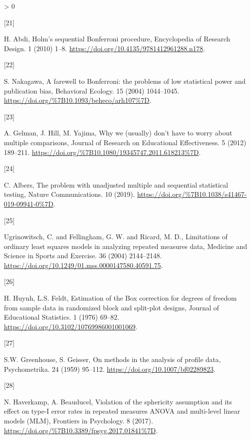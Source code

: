 \documentclass[
]{article}
\newlength{\cslhangindent}
\newlength{\csllabelwidth}
\newenvironment{CSLReferences}[2] %
 {%
  \setlength{\parindent}{0pt}
  \ifodd #1 \everypar{\setlength{\hangindent}{\cslhangindent}}\ignorespaces\fi
  \ifnum #2 > 0
  \setlength{\parskip}{#2\baselineskip}
  \fi
 }%
 {}
\newcommand{\CSLLeftMargin}[1]{\parbox[t]{\csllabelwidth}{#1}}
\newcommand{\CSLRightInline}[1]{\parbox[t]{\linewidth - \csllabelwidth}{#1}\break}
\begin{document}
\begin{CSLReferences}{0}{0}
\leavevmode\hypertarget{ref-abdi2010}{}%
\CSLLeftMargin{{[}21{]} }
\CSLRightInline{H. Abdi, {Holm's sequential Bonferroni procedure}, Encyclopedia of Research Design. 1 (2010) 1--8. \url{https://doi.org/10.4135/9781412961288.n178}.}

\leavevmode\hypertarget{ref-nakagawa2004}{}%
\CSLLeftMargin{{[}22{]} }
\CSLRightInline{S. Nakagawa, {A farewell to Bonferroni: the problems of low statistical power and publication bias}, {Behavioral Ecology}. {15} (2004) 1044--1045. \url{https://doi.org/\%7B10.1093/beheco/arh107\%7D}.}

\leavevmode\hypertarget{ref-gelman2012}{}%
\CSLLeftMargin{{[}23{]} }
\CSLRightInline{A. Gelman, J. Hill, M. Yajima, {Why we (usually) don't have to worry about multiple comparisons}, {Journal of Research on Educational Effectiveness}. {5} (2012) 189--211. \url{https://doi.org/\%7B10.1080/19345747.2011.618213\%7D}.}

\leavevmode\hypertarget{ref-albers2019}{}%
\CSLLeftMargin{{[}24{]} }
\CSLRightInline{C. Albers, {The problem with unadjusted multiple and sequential statistical testing}, {Nature Communications}. {10} (2019). \url{https://doi.org/\%7B10.1038/s41467-019-09941-0\%7D}.}

\leavevmode\hypertarget{ref-ugrinowitsch2004}{}%
\CSLLeftMargin{{[}25{]} }
\CSLRightInline{Ugrinowitsch, C. and Fellingham, G. W. and Ricard, M. D., Limitations of ordinary least squares models in analyzing repeated measures data, Medicine and Science in Sports and Exercise. 36 (2004) 2144--2148. \url{https://doi.org/10.1249/01.mss.0000147580.40591.75}.}

\leavevmode\hypertarget{ref-huynh1976}{}%
\CSLLeftMargin{{[}26{]} }
\CSLRightInline{H. Huynh, L.S. Feldt, {Estimation of the Box correction for degrees of freedom from sample data in randomized block and split-plot designs}, Journal of Educational Statistics. 1 (1976) 69--82. \url{https://doi.org/10.3102/10769986001001069}.}

\leavevmode\hypertarget{ref-greenhouse1959}{}%
\CSLLeftMargin{{[}27{]} }
\CSLRightInline{S.W. Greenhouse, S. Geisser, On methods in the analysis of profile data, Psychometrika. 24 (1959) 95--112. \url{https://doi.org/10.1007/bf02289823}.}

\leavevmode\hypertarget{ref-haverkamp2017}{}%
\CSLLeftMargin{{[}28{]} }
\CSLRightInline{N. Haverkamp, A. Beauducel, {Violation of the sphericity assumption and its effect on type-I error rates in repeated measures ANOVA and multi-level linear models (MLM)}, {Frontiers in Psychology}. {8} (2017). \url{https://doi.org/\%7B10.3389/fpsyg.2017.01841\%7D}.}


\end{CSLReferences}
\end{document}

